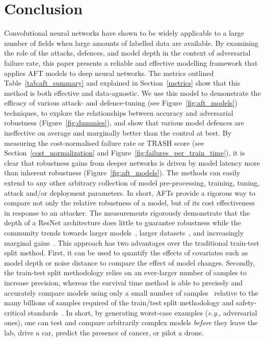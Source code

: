 \section{Conclusion}
Convolutional neural networks have shown to be widely applicable to a large number of fields when large amounts of labelled data are available.
By examining the role of the attacks, defences, and model depth in the context of adversarial failure rate, this paper presents a reliable and effective modelling framework that applies AFT models to deep neural networks.
The metrics outlined Table~\ref{tab:aft_summary} and explained in Section~\ref{metrics} show that this method is both effective and data-agnostic.  We use this model to demonstrate the efficacy of various attack- and defence-tuning (see Figure~\ref{fig:aft_models}) techniques, to  explore the relationships between accuracy and adversarial robustness (Figure~\ref{fig:dummies}), and show that various model defences are ineffective on average and marginally better than the control at best.
By measuring the cost-normalised failure rate or TRASH score (see Section~\ref{cost_normalization} and Figure~\ref{fig:failures_per_train_time}), it is clear that robustness gains from deeper networks is driven by model latency more than inherent robustness (Figure~\ref{fig:aft_models}).
The methods can easily extend to any other arbitrary collection of model pre-processing, training, tuning, attack and/or deployment parameters. In short, AFTs provide a rigorous way to compare not only the relative robustness of a model, but of its cost effectiveness in response to an attacker.
The measurements rigorously demonstrate  that the depth of a ResNet architecture does little to guarantee robustness while the community trends towards larger models~\cite{desislavov2021compute}, larger datasets~\cite{desislavov2021compute,bailly2022effects}, and increasingly marginal gains~\cite{sun2017revisiting}. This approach has two advantages over the traditional train-test split method.
First, it can be used to quantify the effects of covariates such as model depth or noise distance to compare the effect of model changes. Secondly, the train-test split methodology relies on an ever-larger number of samples to increase precision, whereas the survival time method is able to precisely and accurately compare models using only a small number of samples~\cite{schmoor2000sample,lachin1981introduction} relative to the many billions of samples required of the train/test split methodology and safety-critical standards~\cite{iso26262,IEC61508,IEC62034,meyers}.
In short, by generating worst-case examples (\textit{e.g.}, adversarial ones), one can test and compare arbitrarily complex models \textit{before} they leave the lab, drive a car, predict the presence of cancer, or pilot a drone.
